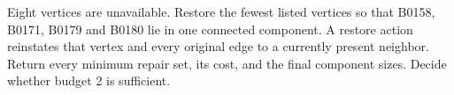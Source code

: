 Eight vertices are unavailable. Restore the fewest listed vertices so that B0158, B0171, B0179 and B0180 lie in one connected component. A restore action reinstates that vertex and every original edge to a currently present neighbor. Return every minimum repair set, its cost, and the final component sizes. Decide whether budget 2 is sufficient.
